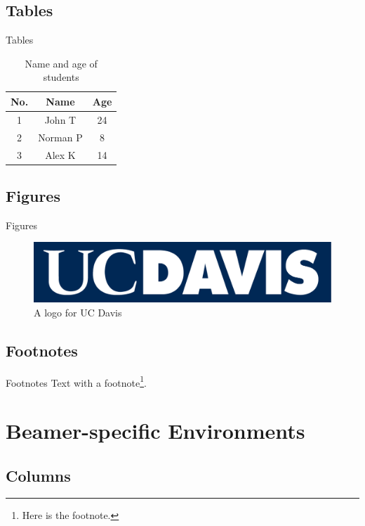 \documentclass{beamer}
\begin{document}
\subsection{Tables}

\begin{frame}{Tables}

\begin{table}
\begin{tabular}{| c || c | c |}
    \hline
    No. & Name & Age \\
    \hline \hline
    1 & John T & 24 \\
    2 & Norman P & 8 \\
    3 & Alex K & 14 \\ 
    \hline
\end{tabular}
\caption{Name and age of students}
\end{table}

\end{frame}

\subsection{Figures}

\begin{frame}{Figures}
\begin{figure}
    \includegraphics[width=0.8\linewidth]{DavisLogoV3.png}
    \caption{A logo for UC Davis}
\end{figure}
\end{frame}

\subsection{Footnotes}

\begin{frame}{Footnotes}
    Text with a footnote\footnote{Here is the footnote.}.
\end{frame}

\section{Beamer-specific Environments}

\subsection{Columns}
\end{document}
